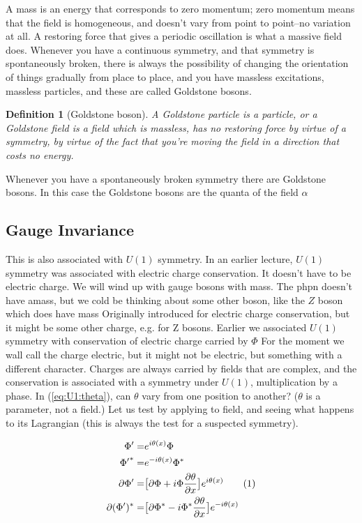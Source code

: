 \documentclass[]{article}
\newcommand\numberthis{\addtocounter{equation}{1}\tag{\theequation}}
\newtheorem{defn}[thm]{Definition}
\begin{document}
A mass is an energy that corresponds to zero momentum; zero momentum means that the field is homogeneous, and doesn't vary from point to point--no variation at all. A restoring force that gives a periodic oscillation is what a massive field does. Whenever you have a continuous symmetry, and that symmetry is spontaneously broken, there is always the possibility of changing the orientation of things gradually from place to place, and you have massless excitations, massless particles, and these are called Goldstone bosons.
\begin{defn}[Goldstone boson]
	 A Goldstone particle is a particle, or a Goldstone field is a field which is massless, has no restoring force by virtue of a symmetry, by virtue of the fact that you're moving the field in a direction that costs no energy.
\end{defn}
 Whenever you have a spontaneously broken symmetry there are Goldstone bosons. In this case the Goldstone bosons are the quanta of the field $\alpha$

\subsection{Gauge Invariance}\label{section:gauge:invariance}

This is also associated with $U(1)$ symmetry. In an earlier lecture, $U(1)$ symmetry was associated with electric charge conservation. It doesn't have to be electric charge. We will wind up with gauge bosons with mass. The phpn doesn't have amass, but we cold be thinking about some other boson, like the $Z$ boson which does have mass  Originally introduced for electric charge conservation, but it might be some other charge, e.g. for Z bosons. Earlier we associated $U(1)$ symmetry with conservation of electric charge carried by $\Phi$ For the moment we wall call the charge electric, but it might not be electric, but something with a different character. Charges are always carried by fields that are complex, and the conservation is associated with a symmetry under $U(1)$, multiplication by a phase.  In (\ref{eq:U1:theta}), can $\theta$ vary from one position to another? ($\theta$ is a parameter, not a field.) Let us test by applying to field, and seeing what happens to its Lagrangian (this is always the test for a suspected symmetry).

\begin{align*}
	\Phi^\prime =& e^{i \theta(x)} \Phi \\
	{\Phi^\prime}^* =& e^{-i \theta(x)} \Phi^*\\
	\partial \Phi^\prime =& \big[\partial \Phi + i \Phi \frac{\partial \theta}{\partial x}\big] e^{i \theta(x)} \numberthis \label{eq:phi:dash:deriv}\\
	\partial (\Phi^\prime)^* =& \big[\partial \Phi^* - i \Phi^* \frac{\partial \theta}{\partial x}\big] e^{-i \theta(x)}
\end{align*}
\end{document}

